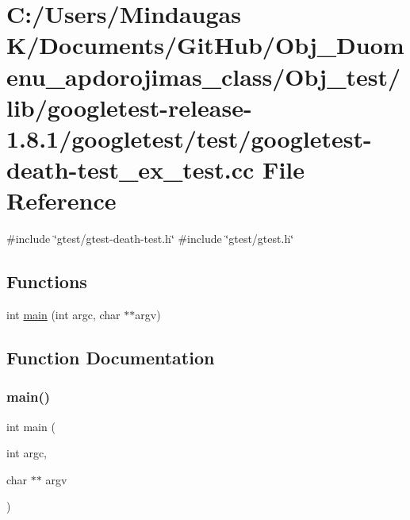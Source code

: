 \hypertarget{_obj__test_2lib_2googletest-release-1_88_81_2googletest_2test_2googletest-death-test__ex__test_8cc}{}\section{C\+:/\+Users/\+Mindaugas K/\+Documents/\+Git\+Hub/\+Obj\+\_\+\+Duomenu\+\_\+apdorojimas\+\_\+class/\+Obj\+\_\+test/lib/googletest-\/release-\/1.8.1/googletest/test/googletest-\/death-\/test\+\_\+ex\+\_\+test.cc File Reference}
\label{_obj__test_2lib_2googletest-release-1_88_81_2googletest_2test_2googletest-death-test__ex__test_8cc}
{\ttfamily \#include \char`\"{}gtest/gtest-\/death-\/test.\+h\char`\"{}}\newline
{\ttfamily \#include \char`\"{}gtest/gtest.\+h\char`\"{}}\newline
\subsection*{Functions}
\begin{DoxyCompactItemize}
\item 
int \mbox{\hyperlink{_obj__test_2lib_2googletest-release-1_88_81_2googletest_2test_2googletest-death-test__ex__test_8cc_a3c04138a5bfe5d72780bb7e82a18e627}{main}} (int argc, char $\ast$$\ast$argv)
\end{DoxyCompactItemize}


\subsection{Function Documentation}
\mbox{\label{_obj__test_2lib_2googletest-release-1_88_81_2googletest_2test_2googletest-death-test__ex__test_8cc_a3c04138a5bfe5d72780bb7e82a18e627}} 
\subsubsection{\texorpdfstring{main()}{main()}}
{\footnotesize\ttfamily int main (\begin{DoxyParamCaption}\item[{int}]{argc,  }\item[{char $\ast$$\ast$}]{argv }\end{DoxyParamCaption})}

